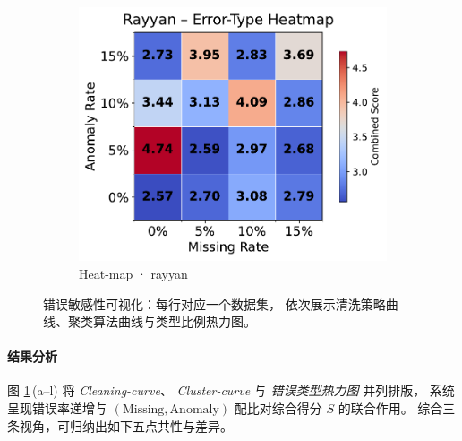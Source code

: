 \documentclass[10pt]{article} %
\numberwithin{equation}{section}
\begin{document}
\begin{figure}[htbp]
\begin{subfigure}{0.295\linewidth}
    \includegraphics[width=\linewidth]{figures/5.3.2graph/rayyan_heatmap.pdf}
    \caption{Heat-map · rayyan}
  \end{subfigure}

  \caption{错误敏感性可视化：每行对应一个数据集，
           依次展示清洗策略曲线、聚类算法曲线与类型比例热力图。}
  \label{fig:error_sense_all}
\end{figure}

\paragraph{结果分析}
\label{sec:error_sense_synthesis}

图 \ref{fig:error_sense_all}\,(a–l) 将 \emph{Cleaning-curve}、%
\emph{Cluster-curve} 与 \emph{错误类型热力图} 并列排版，%
系统呈现错误率递增与 \((\text{Missing},\text{Anomaly})\) 配比对综合得分 \(S\) 的联合作用。
综合三条视角，可归纳出如下五点共性与差异。
\end{document}
